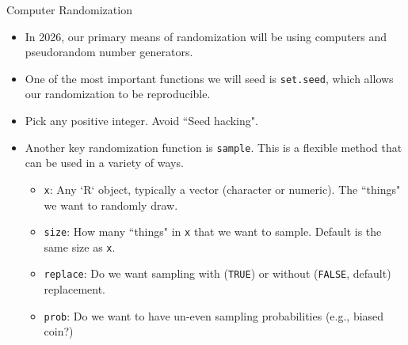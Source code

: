 \begin{frame}{Computer Randomization}
  \begin{itemize}
    \item In 2026, our primary means of randomization will be using computers and \alert{pseudorandom} number generators.
    \item One of the most important functions we will seed is \texttt{set.seed}, which allows our randomization to be \alert{reproducible}. 
  
\begin{knitrout}\small
{}\color{fgcolor}\begin{kframe}
\begin{alltt}
\hldef{(}\hldef{)}
\end{alltt}
\end{kframe}
\end{knitrout}

    \item Pick any positive integer. Avoid ``Seed hacking".
  
  \end{itemize}

\framebreak

\begin{itemize}
  \item Another key randomization function is \texttt{sample}. This is a flexible method that can be used in a variety of ways.
  
\begin{knitrout}\small
{}\color{fgcolor}\begin{kframe}
\begin{alltt}
\end{alltt}
\end{kframe}
\end{knitrout}
  
  \begin{itemize}
    \item \texttt{x}: Any `R` object, typically a vector (character or numeric). The ``things" we want to randomly draw.
    \item \texttt{size}: How many ``things" in \texttt{x} that we want to sample. Default is the same size as \texttt{x}.
    \item \texttt{replace}: Do we want sampling with (\texttt{TRUE}) or without (\texttt{FALSE}, default) replacement.
    \item \texttt{prob}: Do we want to have un-even sampling probabilities (e.g., biased coin?)
  \end{itemize}
  

\end{itemize}
\end{frame}
